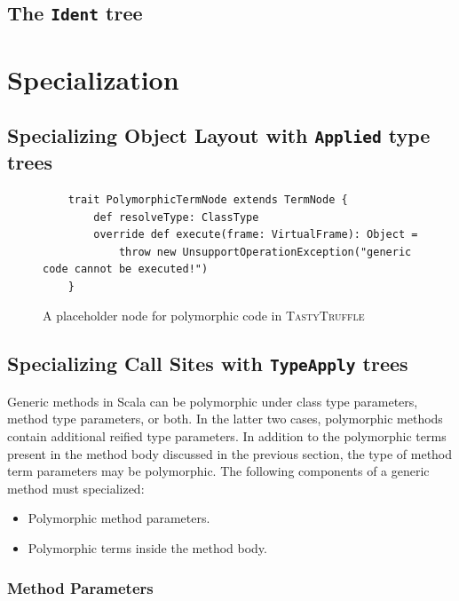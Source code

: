 \subsection{The \texttt{Ident} tree}

\section{Specialization}
\label{implementation:specialization}

\subsection{}

\subsection{Specializing Object Layout with \texttt{Applied} type trees}

\begin{figure}[!htb]
	\begin{verbatim}
	trait PolymorphicTermNode extends TermNode {
		def resolveType: ClassType 
		override def execute(frame: VirtualFrame): Object = 
			throw new UnsupportOperationException("generic code cannot be executed!")
	}
	\end{verbatim}
	\caption{A placeholder node for polymorphic code in \textsc{TastyTruffle}}
\end{figure}


\subsection{Specializing Call Sites with \texttt{TypeApply} trees}

Generic methods in Scala can be polymorphic under class type parameters, method type parameters, or both. 
In the latter two cases, polymorphic methods contain additional reified type parameters. 
In addition to the polymorphic terms present in the method body discussed in the previous section, the type of method term parameters may be polymorphic. 
The following components of a generic method must specialized:

\begin{itemize}
	\item Polymorphic method parameters.
	\item Polymorphic terms inside the method body.
\end{itemize}


\subsubsection*{Method Parameters}

